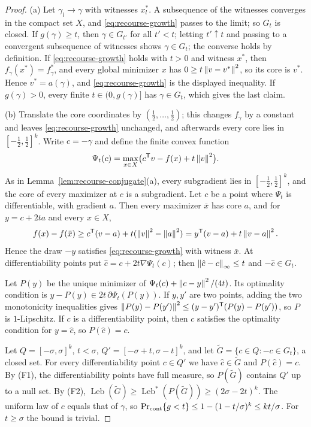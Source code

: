 \begin{proof}
(a) Let $\gamma_l\to\gamma$ with witnesses $x^*_l$. A subsequence of the
witnesses converges in the compact set $X$, and \eqref{eq:recourse-growth}
passes to the limit; so $G_t$ is closed. If $g(\gamma)\ge t$, then
$\gamma\in G_{t'}$ for all $t'<t$; letting $t'\uparrow t$ and passing to
a convergent subsequence of witnesses shows $\gamma\in G_t$; the
converse holds by definition. If \eqref{eq:recourse-growth} holds with
$t>0$ and witness $x^*$, then $f_\gamma(x^*)=f_\gamma^*$, and every global
minimizer $x$ has $0\ge t\left\lVert v-v^*\right\rVert^2$, so its core is $v^*$. Hence
$v^*=a(\gamma)$, and \eqref{eq:recourse-growth} is the displayed
inequality. If $g(\gamma)>0$, every finite $t\in(0,g(\gamma)]$ has
$\gamma\in G_t$, which gives the last claim.

(b) Translate the core coordinates by $(\frac12,\ldots,\frac12)$; this
changes $f_\gamma$ by a constant and leaves \eqref{eq:recourse-growth}
unchanged, and afterwards every core lies in $[-\frac12,\frac12]^k$.
Write $c=-\gamma$ and define the finite convex function
\[
 \Psi_t(c)=\max_{x\in X}\bigl(c^{\mathsf T}v-f(x)+t\left\lVert v\right\rVert^2\bigr).
\]
As in Lemma~\ref{lem:recourse-conjugate}(a), every subgradient lies in
$[-\frac12,\frac12]^k$, and the core of every maximizer at $c$ is a
subgradient. Let $c$ be a point where $\Psi_t$ is differentiable, with
gradient $a$. Then every maximizer $\bar x$ has core $a$, and for
$y=c+2ta$ and every $x\in X$,
\[
 f(x)-f(\bar x)\ge c^{\mathsf T}(v-a)+t(\left\lVert v\right\rVert^2-\left\lVert a\right\rVert^2)
 =y^{\mathsf T}(v-a)+t\left\lVert v-a\right\rVert^2 .
\]
Hence the draw $-y$ satisfies \eqref{eq:recourse-growth} with witness
$\bar x$. At differentiability points put $\hat c=c+2t\nabla\Psi_t(c)$;
then $\left\lVert\hat c-c\right\rVert_\infty\le t$ and $-\hat c\in G_t$.

Let $P(y)$ be the unique minimizer of
$\Psi_t(c)+\left\lVert c-y\right\rVert^2/(4t)$. Its optimality condition is
$y-P(y)\in2t\,\partial\Psi_t(P(y))$. If $y,y'$ are two points, adding the
two monotonicity inequalities gives
$\left\lVert P(y)-P(y')\right\rVert^2\le(y-y')^{\mathsf T}(P(y)-P(y'))$, so $P$ is
$1$-Lipschitz. If $c$ is a differentiability point, then $c$ satisfies
the optimality condition for $y=\hat c$, so $P(\hat c)=c$.

Let $Q=[-\sigma,\sigma]^k$, $t<\sigma$, $Q'=[-\sigma+t,\sigma-t]^k$, and
let $\widetilde G=\{c\in Q:-c\in G_t\}$, a closed set. For every
differentiability point $c\in Q'$ we have $\hat c\in\widetilde G$ and
$P(\hat c)=c$. By (F1), the differentiability points have full measure, so
$P(\widetilde G)$ contains $Q'$ up to a null set. By (F2),
$\operatorname{Leb}(\widetilde G)\ge\operatorname{Leb}^*(P(\widetilde G))
\ge(2\sigma-2t)^k$. The uniform law of $c$ equals that of $\gamma$, so
$\Pr_{\rm cont}\{g<t\}\le1-(1-t/\sigma)^k\le kt/\sigma$. For
$t\ge\sigma$ the bound is trivial.


\end{proof}
